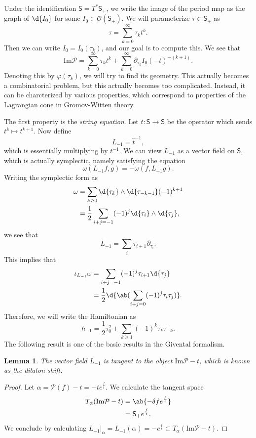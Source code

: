 \documentclass[article,10pt,oneside,oldfontcommands]{memoir}
\newtheorem{lem}[thm]{Lemma}
\theoremstyle{definition}
\theoremstyle{remark}
\theoremstyle{plain}
\theoremstyle{definition}
\theoremstyle{remark}
\newcommand{\Ima}{\mathrm{Im}}
\newcommand{\mc}[1]{\mathcal{#1}}
\newcommand{\ms}[1]{\mathsf{#1}}
\newcommand{\1}{\mathbf{1}}
\newcommand{\2}{\mathbf{2}}
\newcommand{\3}{\mathbf{3}}
\begin{document}
Under the identification \(\ms{S} = T^* \ms{S}_+\), we write the image of the period map as the graph of \(\d{I_0}\) for some \(I_0 \in \mc{O}(\ms{S}_+)\). We will parameterize \(\tau \in \ms{S}_+\) as
\[ \tau = \sum_{k = 0}^{\infty} \tau_k t^k. \]
Then we can write \(I_0 = I_0(\tau_k)\), and our goal is to compute this. We see that
\[ \Ima\mc{P} = \sum_{k = 0}^{\infty} \tau_k t^k + \sum_{k = 0}^{\infty} \partial_{\tau_k}  I_0 (-t)^{-(k+1)}. \]
Denoting this by \(\varphi(\tau_k)\), we will try to find its geometry. This actually becomes a combinatorial problem, but this actually becomes too complicated. Instead, it can be charcterized by various properties, which correspond to properties of the Lagrangian cone in Gromov-Witten theory.

The first property is the \textit{string equation}. Let \(\hat{t} \colon \ms{S} \to \ms{S}\) be the operator which sends \(t^k \mapsto t^{k+1}\). Now define
\[ L_{-1} = \hat{t}^{-1}, \]
which is essentially multiplying by \(t^{-1}\). We can view \(L_{-1}\) as a vector field on \(\ms{S}\), which is actually symplectic, namely satisfying the equation
\[ \omega(L_{-1} f, g) = - \omega(f, L_{-1} g). \]
Writing the symplectic form as
\begin{align*}
    \omega &= \sum_{k \geq 0} \d{\tau_k} \wedge \d{\tau_{-k-1}} (-1)^{k+1} \\
    &= \frac{1}{2} \sum_{i+j=-1} (-1)^{j} \d{\tau_i} \wedge \d{\tau_j},
\end{align*}
we see that
\[ L_{-1} = \sum_i \tau_{i+1} \partial_{\tau_i}. \]
This implies that
\begin{align*}
    \iota_{L_{-1}} \omega &= \sum_{i+j=-1} (-1)^j \tau_{i+1} \d{\tau_j} \\
    &= \frac{1}{2} \d{\ab(\sum_{i+j=0} (-1)^j \tau_i \tau_j)}.
\end{align*}
Therefore, we will write the Hamiltonian as
\[ h_{-1} = \frac{1}{2} \tau_0^2 + \sum_{k \geq 1} (-1)^k \tau_k \tau_{-k}. \]
The following result is one of the basic results in the Givental formalism.

\begin{lem}
    The vector field \(L_{-1}\) is tangent to the object \(\Ima\mc{P} - t\), which is known as the \textit{dilaton shift}.
\end{lem}

\begin{proof}
    Let \(\alpha = \mc{P}(f) - t = -t e^{\frac{f}{t}}\). We calculate the tangent space
    \begin{align*}
        T_{\alpha} (\Ima\mc{P} - t) &= \ab\{ - \delta f e^{\frac{f}{t}} \} \\
        &= \ms{S}_+ e^{\frac{f}{t}}.
    \end{align*}
    We conclude by calculating \(L_{-1}|_{\alpha} = L_{-1}(\alpha) = - e^{\frac{f}{t}} \subset T_{\alpha} (\Ima\mc{P} - t)\).
\end{proof}
\end{document}
